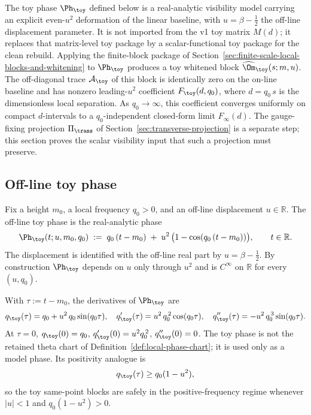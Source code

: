 The toy phase \(\Ph_\toy\) defined below is a real-analytic visibility
model carrying an explicit even-\(u^2\) deformation of the linear
baseline, with \(u=\beta-\tfrac12\) the off-line displacement parameter.
It is not imported from the v1 toy matrix \(M(d)\); it replaces that
matrix-level toy package by a scalar-functional toy package for the
clean rebuild.  Applying the finite-block package of
Section~\ref{sec:finite-scale-local-blocks-and-whitening} to
\(\Ph_\toy\) produces a toy whitened block
\(\widehat\Om_\toy(s;m,u)\).  The off-diagonal trace
\(\mathcal A_\toy\) of this block is identically zero on the on-line
baseline and has nonzero leading-\(u^2\) coefficient
\(F_\toy(d,q_0)\), where \(d=q_0\,s\) is the dimensionless local
separation.  As \(q_0\to\infty\), this coefficient converges uniformly
on compact \(d\)-intervals to a \(q_0\)-independent closed-form limit
\(F_{\infty}(d)\).  The gauge-fixing projection
\(\Pi_\trans\) of Section~\ref{sec:transverse-projection} is a separate
step; this section proves the scalar visibility input that such a
projection must preserve.

\subsection{Off-line toy phase}
\label{subsec:off-line-toy-phase}

\begin{definition}
\label{def:off-line-toy-phase}
Fix a height \(m_0\), a local frequency \(q_0>0\), and an off-line
displacement \(u\in\mathbb R\).  The off-line toy phase is the
real-analytic phase
\begin{equation}
\label{eq:toy-phase}
\Ph_\toy(t;u,m_0,q_0)
\;:=\;q_0\,(t-m_0)\;+\;u^2\,\bigl(1-\cos(q_0\,(t-m_0))\bigr),
\qquad t\in\mathbb R.
\end{equation}
The displacement is identified with the off-line real part by
\(u=\beta-\tfrac12\).  By construction \(\Ph_\toy\) depends on \(u\)
only through \(u^2\) and is \(C^\infty\) on \(\mathbb R\) for every
\((u,q_0)\).
\end{definition}

\begin{lemma}
\label{lem:toy-phase-derivatives}
With \(\tau:=t-m_0\), the derivatives of \(\Ph_\toy\) are
\begin{equation}
\label{eq:toy-phase-derivatives}
q_\toy(\tau)
=q_0+u^2\,q_0\sin(q_0\tau),
\quad
q_\toy'(\tau)=u^2\,q_0^{\,2}\cos(q_0\tau),
\quad
q_\toy''(\tau)=-u^2\,q_0^{\,3}\sin(q_0\tau).
\end{equation}
At \(\tau=0\),
\(q_\toy(0)=q_0\), \(q_\toy'(0)=u^2 q_0^{\,2}\),
\(q_\toy''(0)=0\).  The toy phase is not the retained theta chart of
Definition~\ref{def:local-phase-chart}; it is used only as a model
phase.  Its positivity analogue is
\[
        q_\toy(\tau)\ge q_0(1-u^2),
\]
so the toy same-point blocks are safely in the positive-frequency regime
whenever \(|u|<1\) and \(q_0(1-u^2)>0\).
\end{lemma}

